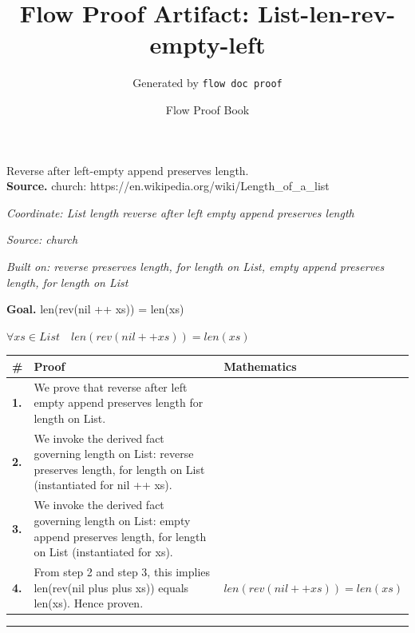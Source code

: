 \documentclass[11pt]{article}
\title{Flow Proof Artifact: List-len-rev-empty-left}
\author{Generated by \texttt{flow doc proof}}
\date{Flow Proof Book}
\theoremstyle{definition}
\begin{document}
\maketitle
Reverse after left-empty append preserves length.\\[0.5em]
\textbf{Source.} church: https://en.wikipedia.org/wiki/Length\_of\_a\_list\\[0.5em]
\bigskip
{}\par
\smallskip\noindent\textit{Coordinate: List \cdot length \cdot reverse after left empty append preserves length}\par
\smallskip\noindent\textit{Source: church}\par
\smallskip\noindent\textit{Built on: reverse preserves length, for length on List, empty append preserves length, for length on List}\par
\medskip
\noindent\textbf{Goal.} len(rev(nil ++ xs)) = len(xs)\par
\noindent$\displaystyle \forall xs \in List\quad len(rev(nil ++ xs)) = len(xs)$\par
\medskip
\noindent
\begin{tabular}{@{} >{\raggedright\arraybackslash}p{} >{\raggedright\arraybackslash}p{} >{\raggedleft\arraybackslash}p{} @{}}
\textbf{\#} & \textbf{Proof} & \textbf{Mathematics} \\
\midrule
\textbf{1.} & We prove that reverse after left empty append preserves length for length on List. & \\[0.45em]
\textbf{2.} & We invoke the derived fact governing length on List: reverse preserves length, for length on List (instantiated for nil ++ xs). & \\[0.45em]
\textbf{3.} & We invoke the derived fact governing length on List: empty append preserves length, for length on List (instantiated for xs). & \\[0.45em]
\textbf{4.} & From step 2 and step 3, this implies len(rev(nil plus plus xs)) equals len(xs). Hence proven. & $\displaystyle len(rev(nil ++ xs)) = len(xs)$ \\[0.45em]
\bottomrule
\end{tabular}
\label{thm:List-length-reverse_after_left_empty_append_preserves_length}
\par\medskip\hrule
\end{document}
